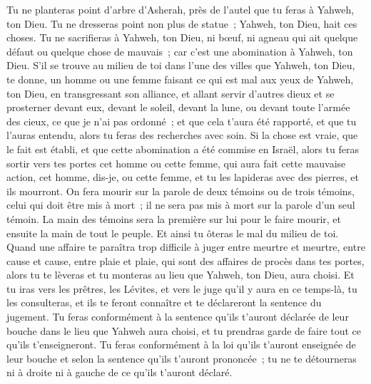 \begin{multicols}{2}
Tu ne planteras point d'arbre d'Asherah, près de l'autel que tu feras à Yahweh, ton Dieu.
Tu ne dresseras point non plus de statue~; Yahweh, ton Dieu, hait ces choses.
\VerseOne{}Tu ne sacrifieras à Yahweh, ton Dieu, ni bœuf, ni agneau qui ait quelque défaut ou quelque chose de mauvais~; car c'est une abomination à Yahweh, ton Dieu.
S'il se trouve au milieu de toi dans l'une des villes que Yahweh, ton Dieu, te donne, un homme ou une femme faisant ce qui est mal aux yeux de Yahweh, ton Dieu, en transgressant son alliance,
et allant servir d'autres dieux et se prosterner devant eux, devant le soleil, devant la lune, ou devant toute l'armée des cieux, ce que je n'ai pas ordonné~;
et que cela t'aura été rapporté, et que tu l'auras entendu, alors tu feras des recherches avec soin. Si la chose est vraie, que le fait est établi, et que cette abomination a été commise en Israël,
alors tu feras sortir vers tes portes cet homme ou cette femme, qui aura fait cette mauvaise action, cet homme, dis-je, ou cette femme, et tu les lapideras avec des pierres, et ils mourront.
On fera mourir sur la parole de deux témoins ou de trois témoins, celui qui doit être mis à mort~; il ne sera pas mis à mort sur la parole d'un seul témoin.
La main des témoins sera la première sur lui pour le faire mourir, et ensuite la main de tout le peuple. Et ainsi tu ôteras le mal du milieu de toi.
Quand une affaire te paraîtra trop difficile à juger entre meurtre et meurtre, entre cause et cause, entre plaie et plaie, qui sont des affaires de procès dans tes portes, alors tu te lèveras et tu monteras au lieu que Yahweh, ton Dieu, aura choisi.
Et tu iras vers les prêtres, les Lévites, et vers le juge qu'il y aura en ce temps-là, tu les consulteras, et ils te feront connaître et te déclareront la sentence du jugement.
Tu feras conformément à la sentence qu'ils t'auront déclarée de leur bouche dans le lieu que Yahweh aura choisi, et tu prendras garde de faire tout ce qu'ils t'enseigneront.
Tu feras conformément à la loi qu'ils t'auront enseignée de leur bouche et selon la sentence qu'ils t'auront prononcée~; tu ne te détourneras ni à droite ni à gauche de ce qu'ils t'auront déclaré.

\end{multicols}
